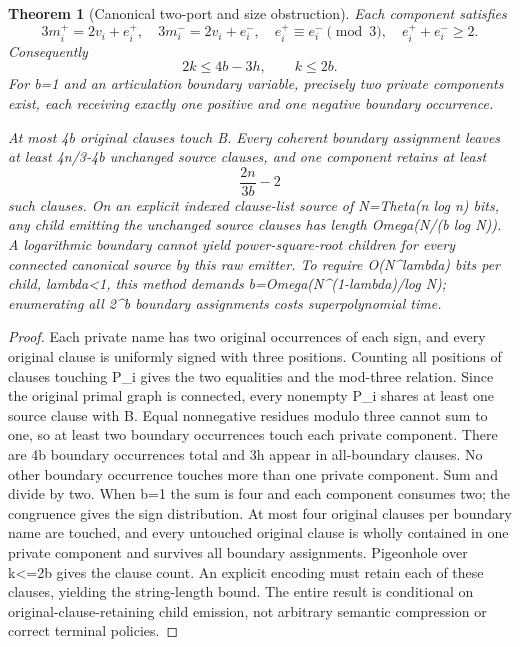 \documentclass[11pt]{article}
\newtheorem{theorem}{Theorem}
\begin{document}
\begin{theorem}[Canonical two-port and size obstruction]
Each component satisfies
\[
3m_i^+=2v_i+e_i^+,\quad
3m_i^-=2v_i+e_i^-,\quad
e_i^+\equiv e_i^-\pmod3,\quad e_i^++e_i^-\ge2.
\]
Consequently
\[
\boxed{2k\le 4b-3h,\qquad k\le2b.}
\]
For b=1 and an articulation boundary variable, precisely two private components exist, each receiving exactly one positive and one negative boundary occurrence.

At most 4b original clauses touch B. Every coherent boundary assignment leaves at least 4n/3-4b \emph{unchanged} source clauses, and one component retains at least
\[
\boxed{\frac{2n}{3b}-2}
\]
such clauses. On an explicit indexed clause-list source of N=Theta(n log n) bits, any child emitting the unchanged source clauses has length Omega(N/(b log N)). A logarithmic boundary cannot yield power-square-root children for \emph{every} connected canonical source by this raw emitter. To require O(N^lambda) bits per child, lambda<1, this method demands b=Omega(N^(1-lambda)/log N); enumerating all 2^b boundary assignments costs superpolynomial time.
\end{theorem}
\begin{proof}
Each private name has two original occurrences of each sign, and every original clause is uniformly signed with three positions. Counting all positions of clauses touching P_i gives the two equalities and the mod-three relation. Since the original primal graph is connected, every nonempty P_i shares at least one source clause with B. Equal nonnegative residues modulo three cannot sum to one, so at least two boundary occurrences touch each private component. There are 4b boundary occurrences total and 3h appear in all-boundary clauses. No other boundary occurrence touches more than one private component. Sum and divide by two. When b=1 the sum is four and each component consumes two; the congruence gives the sign distribution. At most four original clauses per boundary name are touched, and every untouched original clause is wholly contained in one private component and survives all boundary assignments. Pigeonhole over k<=2b gives the clause count. An explicit encoding must retain each of these clauses, yielding the string-length bound. The entire result is conditional on original-clause-retaining child emission, not arbitrary semantic compression or correct terminal policies.
\end{proof}
\end{document}
